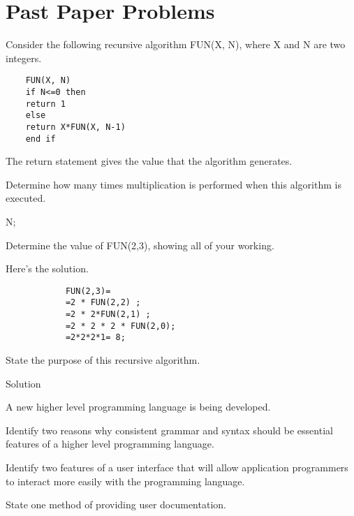 \section{Past Paper Problems}
\begin{exercise*} %
Consider the following recursive algorithm FUN(X, N), where X and N are two integers.	
	\begin{verbatim}
	FUN(X, N)
	if N<=0 then
	return 1
	else
	return X*FUN(X, N-1)
	end if
	\end{verbatim}
	The return statement gives the value that the algorithm generates.
	
	\begin{parts}
		\item Determine how many times multiplication is performed when this algorithm is executed.
		\begin{solution}
			N;
		\end{solution}
		\item Determine the value of FUN(2,3), showing all of your working.
		\begin{solution}
			Here's the solution.
			\begin{verbatim}
			FUN(2,3)=
			=2 * FUN(2,2) ;
			=2 * 2*FUN(2,1) ;
			=2 * 2 * 2 * FUN(2,0);
			=2*2*2*1= 8;
			\end{verbatim}
		\end{solution}
		\item State the purpose of this recursive algorithm.
		\begin{solution}
			Solution
		\end{solution}
	\end{parts}
\end{exercise*}



\begin{exercise*}
A new higher level programming language is being developed.
\begin{parts}
\item Identify two reasons why consistent grammar and syntax should be essential features of a higher level programming language.
\item Identify two features of a user interface that will allow application programmers to interact more easily with the programming language.
\item State one method of providing user documentation.
\end{parts}
\end{exercise*}


